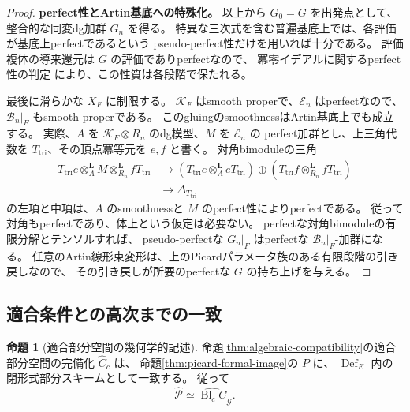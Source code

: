\documentclass[a4paper,11pt]{ltjsarticle}
\theoremstyle{definition}
\newtheorem{theorem}{命題}[section]
\newcommand{\Def}{\operatorname{Def}}
\begin{document}
\begin{proof}
\textbf{perfect性とArtin基底への特殊化。}
以上から $G_0=G$ を出発点として、整合的な同変dg加群 $G_n$ を得る。
特異な三次式を含む普遍基底上では、各評価が基底上perfectであるという
pseudo-perfect性だけを用いれば十分である。
評価複体の導来還元は $G$ の評価でありperfectなので、
冪零イデアルに関するperfect性の判定\cite[Lemma 15.80.4, Tag 07LU]{StacksNilPerfect}
により、この性質は各段階で保たれる。

最後に滑らかな $X_F$ に制限する。
$\mathcal K_F$ はsmooth properで、$\mathcal E_n$ はperfectなので、
$\mathcal B_n|_F$ もsmooth properである。
このgluingのsmoothnessはArtin基底上でも成立する。
実際、$A$ を $\mathcal K_F\otimes R_n$ のdg模型、$M$ を $\mathcal E_n$ の
perfect加群とし、上三角代数を $T_{\mathrm{tri}}$、その頂点冪等元を $e,f$ と書く。
対角bimoduleの三角
\[
 \begin{split}
 T_{\mathrm{tri}}e\otimes_A^{\mathbf L}M\otimes_{R_n}^{\mathbf L}fT_{\mathrm{tri}}
 &\longrightarrow
 (T_{\mathrm{tri}}e\otimes_A^{\mathbf L}eT_{\mathrm{tri}})
 \oplus(T_{\mathrm{tri}}f\otimes_{R_n}^{\mathbf L}fT_{\mathrm{tri}})\\
 &\longrightarrow\Delta_{T_{\mathrm{tri}}}
 \end{split}
\]
の左項と中項は、$A$ のsmoothnessと $M$ のperfect性によりperfectである。
従って対角もperfectであり、体上という仮定は必要ない。
perfectな対角bimoduleの有限分解とテンソルすれば、
pseudo-perfectな $G_n|_F$ はperfectな $\mathcal B_n|_F$-加群になる。
任意のArtin線形束変形は、上のPicardパラメータ族のある有限段階の引き戻しなので、
その引き戻しが所要のperfectな $G$ の持ち上げを与える。
\end{proof}

\subsection{適合条件との高次までの一致}

\begin{theorem}[適合部分空間の幾何学的記述]\label{thm:picard-compatibility-equality}
命題\ref{thm:algebraic-compatibility}の適合部分空間の完備化 $\widehat C_c$ は、
命題\ref{thm:picard-formal-image}の $P$ に、
$\Def_E$ 内の閉形式部分スキームとして一致する。
従って
\[
 \widehat{\mathcal P}
 \simeq\widehat{\operatorname{Bl}_c C}_{\mathcal G}.
\]
\end{theorem}
\end{document}
